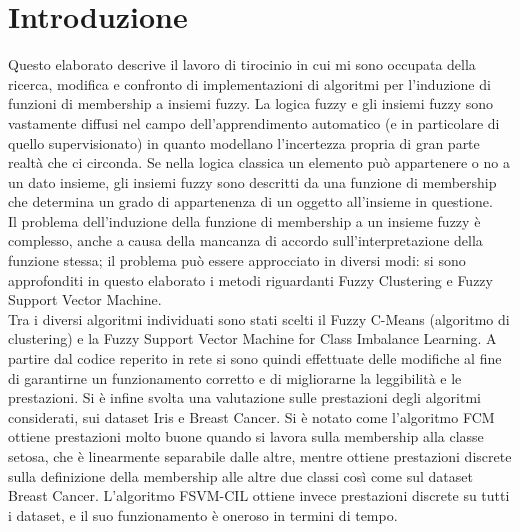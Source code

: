 \documentclass[oneside, openany]{book}
\begin{document}
	\chapter*{Introduzione}
		{} 
		Questo elaborato descrive il lavoro di tirocinio in cui mi sono occupata della ricerca, modifica e confronto di implementazioni di algoritmi per l'induzione di funzioni di membership a insiemi fuzzy. La logica fuzzy e gli insiemi fuzzy sono vastamente diffusi nel campo dell'apprendimento automatico (e in particolare di quello supervisionato) in quanto modellano l'incertezza propria di gran parte realtà che ci circonda. Se nella logica classica un elemento può appartenere o no a un dato insieme, gli insiemi fuzzy sono descritti da una funzione di membership che determina un grado di appartenenza di un oggetto all'insieme in questione.\\
		Il problema dell'induzione della funzione di membership a un insieme fuzzy è complesso, anche a causa della mancanza di accordo sull'interpretazione della funzione stessa; il problema può essere approcciato in diversi modi: si sono approfonditi in questo elaborato i metodi riguardanti Fuzzy Clustering e Fuzzy Support Vector Machine.\\
		Tra i diversi algoritmi individuati sono stati scelti il Fuzzy C-Means (algoritmo di clustering) e la Fuzzy Support Vector Machine for Class Imbalance Learning. A partire dal codice reperito in rete si sono quindi effettuate delle modifiche al fine di garantirne un funzionamento corretto e di migliorarne la leggibilità e le prestazioni. Si è infine svolta una valutazione sulle prestazioni degli algoritmi considerati, sui dataset Iris e Breast Cancer. Si è notato come l'algoritmo FCM ottiene prestazioni molto buone quando si lavora sulla membership alla classe setosa, che è linearmente separabile dalle altre, mentre ottiene prestazioni discrete sulla definizione della membership alle altre due classi così come sul dataset Breast Cancer. L'algoritmo FSVM-CIL ottiene invece prestazioni discrete su tutti i dataset, e il suo funzionamento è oneroso in termini di tempo.
		
\end{document}
